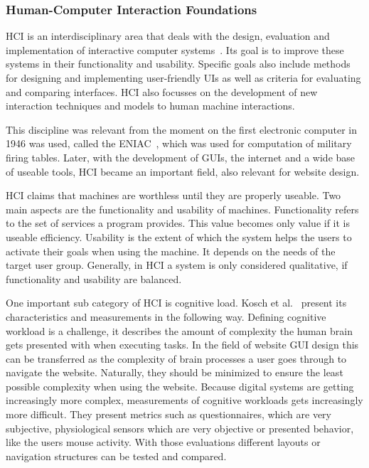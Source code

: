 \subsubsection*{Human-Computer Interaction Foundations}
\ac{HCI} is an interdisciplinary area that deals with the design, evaluation and implementation of interactive computer systems~\cite{sinha_human_2010}. Its goal is to improve these systems in their functionality and usability. 
Specific goals also include methods for designing and implementing user-friendly \acp{UI} as well as criteria for evaluating and comparing interfaces. \ac{HCI} also focusses on the development of new interaction techniques and models to human machine interactions. 

This discipline was relevant from the moment on the first electronic computer in 1946 was used, called the \ac{ENIAC}~\cite{goldstine_electronic_1996}, which was used for computation of military firing tables. Later, with the development of \acp{GUI}, the internet and a wide base of useable tools, \ac{HCI} became an important field, also relevant for website design.

\ac{HCI} claims that machines are worthless until they are properly useable. Two main aspects are the functionality and usability of machines.
Functionality refers to the set of services a program provides. This value becomes only value if it is useable efficiency.
Usability is the extent of which the system helps the users to activate their goals when using the machine. It depends on the needs of the target user group.
Generally, in \ac{HCI} a system is only considered qualitative, if functionality and usability are balanced.

One important sub category of \ac{HCI} is cognitive load. Kosch et al.~\cite{kosch_survey_2023} present its characteristics and measurements in the following way. 
Defining cognitive workload is a challenge, it describes the amount of complexity the human brain gets presented with when executing tasks. In the field of website \ac{GUI} design this can be transferred as the complexity of brain processes a user goes through to navigate the website. Naturally, they should be minimized to ensure the least possible complexity when using the website. %
Because digital systems are getting increasingly more complex, measurements of cognitive workloads gets increasingly more difficult. They present metrics such as questionnaires, which are very subjective, physiological sensors which are very objective or presented behavior, like the users mouse activity.
With those evaluations different layouts or navigation structures can be tested and compared. 

